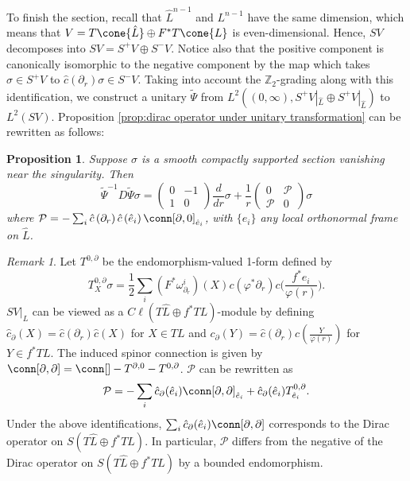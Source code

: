 \documentclass[12pt, reqno]{amsart}
\theoremstyle{plain} %
\newtheorem{proposition}[theorem]{Proposition}
\theoremstyle{definition}
\theoremstyle{remark}
\newtheorem{remark}[theorem]{Remark}
\numberwithin{equation}{section}
\newcommand{\dom}[1]{\hat{#1}}
\newcommand{\cbar}[1]{\dom{c}\left(#1\right)}
\newcommand{\Cl}{C\ell}
\newcommand{\tdim}{n} %
\begin{document}
To finish the section, recall that \(\dom{L}^{\tdim-1}\) and \(L^{\tdim-1}\) have the same dimension, which means that \(V = T\cone{\dom{L}} \oplus F^*T\cone{L}\) is even-dimensional.
Hence, \(SV\) decomposes into \(SV = S^+V \oplus S^-V\). Notice also that the positive component is canonically isomorphic to the negative component by the map which takes \(\sigma \in S^+V\) to \(\cbar{\partial_r} \sigma \in S^-V\).
Taking into account the \(\mathbb{Z}_2\)-grading along with this identification, we construct a unitary \(\widetilde{\Psi}\) from \(L^2((0, \infty), S^+V|_{\dom{L}} \oplus S^+V|_{\dom{L}})\) to \(L^2(SV)\).
Proposition \ref{prop:dirac operator under unitary transformation} can be rewritten as follows:
\begin{proposition}\label{prop:dirac operator under unitary transformation with grading}
    Suppose \(\sigma\) is a smooth compactly supported section vanishing near the singularity.
    Then
    \begin{equation*}
        \widetilde{\Psi}^{-1}D\widetilde{\Psi} \sigma = \begin{pmatrix}
            0 & -1\\
            1 & 0
        \end{pmatrix} \frac{d}{dr} \sigma + \frac{1}{r}\begin{pmatrix}
            0 & \mathcal{P}\\
            \mathcal{P} & 0
        \end{pmatrix} \sigma
    \end{equation*}
    where \(\mathcal{P} = -\sum_i \cbar{\partial_r} \cbar{\dom{e}_i} \conn[\partial, 0]_{\dom{e}_i}\), with \(\{\dom{e}_i\}\) any local orthonormal frame on \(\dom{L}\).
\end{proposition}
\begin{remark}\label{rem:link operator in terms of link dirac operator}
    Let \(T^{0,\partial}\) be the endomorphism-valued 1-form defined by
    \begin{equation*}
    T_X^{0,\partial} \sigma = \frac{1}{2} \sum_i (F^*\omega_{\partial_r}^i)(X) c(\varphi^* \partial_r) c\Big(\frac{f^*e_i}{\varphi(r)}\Big).\end{equation*}
    \(SV|_{\dom{L}}\) can be viewed as a \(\Cl(T\dom{L} \oplus f^*TL)\)-module by defining \(\dom{c}_\partial(X) = \dom{c}(\partial_r)\dom{c}(X)\) for \(X \in TL\) and \(c_\partial(Y) = \dom{c}(\partial_r)c(\frac{Y}{\varphi(r)})\) for \(Y \in f^*TL\).
    The induced spinor connection is given by \(\conn[\partial, \partial] = \conn[] - T^{\partial, 0} - T^{0, \partial}\).
    \(\mathcal{P}\) can be rewritten as
    \begin{equation*}
        \mathcal{P} = -\sum_i \dom  c_\partial(\dom{e}_i) \conn[\partial, \partial]_{\dom{e}_i} + \dom{c}_\partial(\dom{e}_i) T^{0, \partial}_{\dom{e}_i}.
    \end{equation*}
    Under the above identifications, \(\sum_i \dom  c_\partial(\dom{e}_i) \conn[\partial, \partial]\) corresponds to the Dirac operator on \(S(T\dom{L} \oplus f^*TL)\).
    In particular, \(\mathcal{P}\) differs from the negative of the Dirac operator on \(S(T\dom{L} \oplus f^*TL)\) by a bounded endomorphism.
\end{remark}
\end{document}
